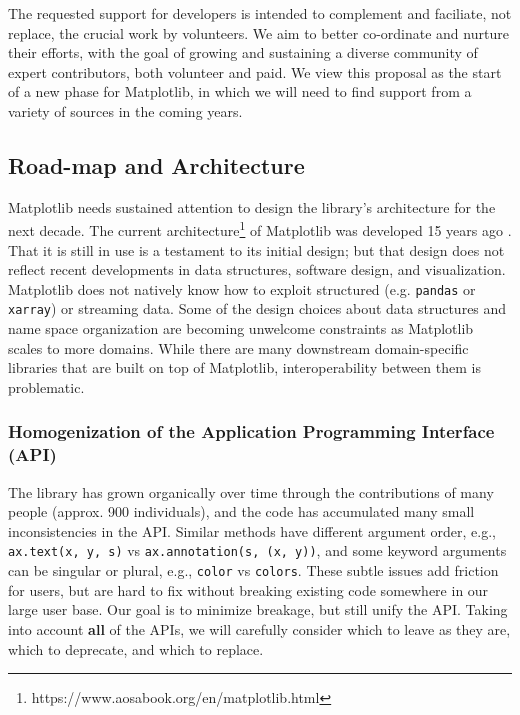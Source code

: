 \documentclass[11pt]{article}  %
\begin{document}
The requested support for developers is intended to complement and
faciliate, not replace, the crucial work by volunteers.  We aim to
better co-ordinate and nurture their
efforts, with the goal of growing and sustaining a diverse community
of expert contributors, both volunteer and paid.  We view
this proposal as the start of a new phase for Matplotlib, in which we
will need to find support from a variety of sources in the coming years.



\subsection{Road-map and Architecture}

Matplotlib needs sustained attention to design the library's
architecture for the next decade.  The current
architecture\footnote{https://www.aosabook.org/en/matplotlib.html} of
Matplotlib was developed 15 years ago \cite{Hunter:2007}.  That it is
still in use is a testament to its initial design; but that design
does not reflect recent developments in data structures, software
design, and visualization.  Matplotlib does not natively know how to
exploit structured (e.g. \texttt{pandas} or \texttt{xarray}) or
streaming data.  Some of the design choices about data structures and
name space organization are
becoming unwelcome constraints as Matplotlib scales to more domains.  While
there are many downstream domain-specific libraries that are built on
top of Matplotlib, interoperability between them is problematic.


\subsubsection{Homogenization of the Application Programming Interface (API)}
\label{sec:api_hom}
The library has grown organically over time through the contributions
of many people (approx. 900 individuals), and the code has accumulated
many small inconsistencies in the API.  Similar methods have different
argument order, e.g., \texttt{ax.text(x, y, s)} vs
\texttt{ax.annotation(s, (x, y))}, and some keyword arguments can be
singular or plural, e.g., \texttt{color} vs \texttt{colors}.  These
subtle issues add friction for users, but are hard to fix without
breaking existing code somewhere in our large user base.  Our goal is
to minimize breakage, but still unify the API.  Taking into account
\textbf{all} of the APIs, we will carefully consider which to leave as
they are, which to deprecate, and which to replace.
\end{document}
